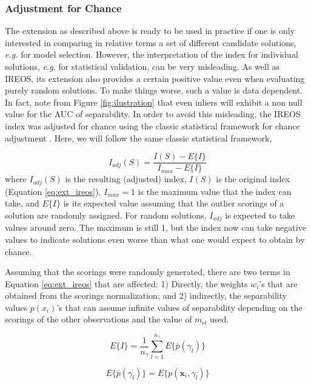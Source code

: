 \subsubsection{Adjustment for Chance}
The extension as described above is ready to be used in practice if one is only interested in comparing in relative terms a set of different candidate solutions, \textit{e.g.} for model selection. However, the interpretation of the index for individual solutions, \textit{e.g.} for statistical validation, can be very misleading. As well as IREOS, its extension also provides a certain positive value even when evaluating purely random solutions. To make things worse, such a value is data dependent. In fact, note from Figure \ref{fig:ilustration} that even inliers will exhibit a non null value for the AUC of separability. In order to avoid this misleading, the IREOS index was adjusted for chance using the classic statistical framework for chance adjustment \cite{hubert1985}. Here, we will follow the same classic statistical framework,

\begin{equation}
I_{adj}(S) = \frac{I(S) - E\{I\}}{I_{max} - E\{I\}}
\end{equation}
where $I_{adj}(S)$ is the resulting (adjusted) index, $I(S)$ is the original index (Equation \ref{eq:ext_ireos}), $I_{max} = 1$ is the maximum value that the index can take, and $E\{I\}$ is its expected value assuming that the outlier scorings of a solution are randomly assigned. For random solutions, $I_{adj}$ is expected to take values around zero. The maximum is still 1, but the index now can take negative values to indicate solutions even worse than what one would expect to obtain by chance.

Assuming that the scorings were randomly generated, there are two terms in Equation \ref{eq:ext_ireos} that are affected: 1) Directly, the weights $w_i$'s that are obtained from the scorings normalization; and 2) indirectly, the separability values $p(\textit{x}_i)$'s that can assume infinite values of separability depending on the scorings of the other observations and the value of $m_{cl}$ used.

\begin{equation}
E\{I\} =  \frac{1}{n_{\gamma}} \sum_{l=1}^{n_{\gamma}} E\{ \bar{p}(\gamma_l) \}
\end{equation}

\begin{equation}
E\{ \bar{p}(\gamma_l) \} = E\{ p(\mathbf{x}_i, \gamma_l) \}
\end{equation}


